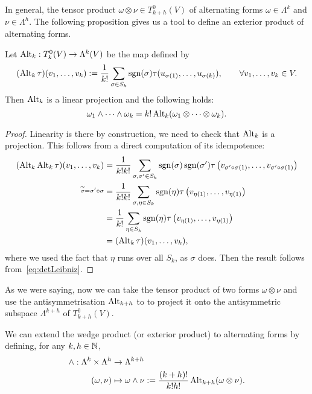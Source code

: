In general, the tensor product $\omega\otimes\nu\in T_{k+h}^0(V)$ of alternating forms $\omega\in\Lambda^k$ and $\nu\in\Lambda^{h}$.
The following proposition gives us a tool to define an exterior product of alternating forms.

\begin{proposition}
  Let $\operatorname{Alt}_k: T_k^0(V)\to \Lambda^k(V)$ be the map defined by
  \begin{equation}
    (\operatorname{Alt}_k\tau)(v_1,\ldots,v_k) := \frac1{k!} \sum_{\sigma\in S_k} \operatorname{sgn}(\sigma) \tau(u_{\sigma(1)}, \ldots, u_{\sigma(k)}),
    \qquad \forall v_1,\ldots,v_k \in V.
  \end{equation} 
  Then $\operatorname{Alt}_k$ is a linear projection and the following holds:
  \begin{equation}
    \omega_1 \wedge \cdots \wedge \omega_k = k! \operatorname{Alt}_k(\omega_1 \otimes \cdots \otimes \omega_k).
  \end{equation}
\end{proposition}
\begin{proof}
  Linearity is there by construction, we need to check that $\operatorname{Alt}_k$ is a projection.
  This follows from a direct computation of its idempotence:
  \begin{align}
    (\operatorname{Alt}_k \operatorname{Alt}_k \tau)(v_1,\ldots, v_k)
    &= \frac1{k!k!}\sum_{\sigma,\sigma'\in S_k}\operatorname{sgn}(\sigma)\operatorname{sgn}(\sigma') \tau\left(v_{\sigma'\circ\sigma(1)}, \ldots, v_{\sigma'\circ\sigma(1)}\right)\\
    \overset{\widetilde \sigma = \sigma'\circ\sigma}{}
    &=\frac1{k!k!}\sum_{\sigma,\eta\in S_k}\operatorname{sgn}(\eta) \tau\left(v_{\eta(1)}, \ldots, v_{\eta(1)}\right) \\
    &=\frac1{k!}\sum_{\eta\in S_k}\operatorname{sgn}(\eta) \tau\left(v_{\eta(1)}, \ldots, v_{\eta(1)}\right) \\
    &=(\operatorname{Alt}_k \tau)(v_1,\ldots, v_k),
  \end{align}
  where we used the fact that $\eta$ runs over all $S_k$, as $\sigma$ does.
  Then the result follows from~\eqref{eq:detLeibniz}.
\end{proof}

As we were saying, now we can take the tensor product of two forms $\omega\otimes\nu$ and use the antisymmetrisation $\operatorname{Alt}_{k+h}$ to to project it onto the antisymmetric subspace $\Lambda^{k+h}$ of $T_{k+h}^0(V)$.

\begin{definition}
  We can extend the wedge product (or exterior product) to alternating forms by defining, for any $k,h\in\mathbb{N}$,
  \begin{align}
    \wedge : \Lambda^k\times\Lambda^h &\to \Lambda^{k+h}\\
    (\omega, \nu) &\mapsto \omega\wedge\nu := \frac{(k+h)!}{k!h!} \operatorname{Alt}_{k+h}(\omega\otimes\nu).
  \end{align}
\end{definition}


